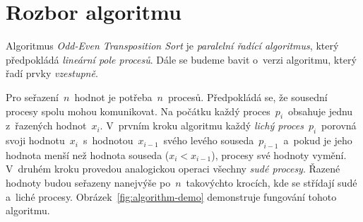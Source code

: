 \documentclass[a4paper, 10pt, twocolumn]{article}
\begin{document}


    \section{Rozbor algoritmu}

    Algoritmus \emph{Odd-Even Transposition Sort} je \emph{paralelní řadící
    algoritmus}, který předpokládá \emph{lineární pole procesů}. Dále se
    budeme bavit o~verzi algoritmu, který řadí prvky \emph{vzestupně}.

    Pro seřazení~$ n $~hodnot je potřeba~$ n $~procesů. Předpokládá se,
    že sousední procesy spolu mohou komunikovat. Na počátku každý
    proces~$ p_i $~obsahuje jednu z~řazených hodnot~$ x_i $. V~prvním kroku
    algoritmu každý \emph{lichý proces}~$ p_i $~porovná svoji
    hodnotu~$ x_i $~s~hodnotou~$ x_{i - 1} $~svého levého
    souseda~$ p_{i - 1} $~a~pokud je jeho hodnota menší než hodnota souseda
    ($ x_i < x_{i - 1} $), procesy své hodnoty vymění. V~druhém kroku
    provedou analogickou operaci všechny \emph{sudé procesy}. Řazené hodnoty
    budou seřazeny nanejvýše po~$ n $~takovýchto krocích, kde se střídají
    sudé a~liché procesy. Obrázek~\ref{fig:algorithm-demo} demonstruje
    fungování tohoto algoritmu.
\end{document}
